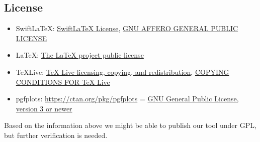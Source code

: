 \subsection{License}
\begin{itemize}
    \item SwiftLaTeX: \href{https://github.com/SwiftLaTeX/SwiftLaTeX/blob/master/LICENSE}{SwiftLaTeX License}, \href{https://www.gnu.org/licenses/agpl-3.0.en.html}{GNU AFFERO GENERAL PUBLIC LICENSE}
    \item LaTeX: \href{https://www.latex-project.org/lppl.txt}{The LaTeX project public license}
    \item TeXLive: \href{https://www.tug.org/texlive/copying.html}{TeX Live licensing, copying, and redistribution}, \href{https://www.tug.org/texlive/LICENSE.TL}{COPYING CONDITIONS FOR TeX Live}
    \item pgfplots: \href{https://ctan.org/pkg/pgfplots}{https://ctan.org/pkg/pgfplots} = \href{https://www.gnu.org/licenses/gpl-3.0.en.html}{GNU General Public License, version 3 or newer}
\end{itemize}
Based on the information above we might be able to publish our tool under GPL, but further verification is needed.